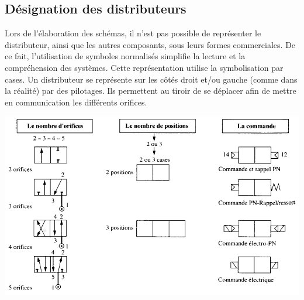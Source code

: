 \documentclass[10pt]{article}
\begin{document}
\subsection{Désignation des distributeurs}
Lors de l'élaboration des schémas, il n'est pas possible de représenter le distributeur, ainsi que les autres composants, sous leurs formes commerciales. De ce fait, l'utilisation de symboles normalisés simplifie la lecture et la compréhension des systèmes. Cette représentation utilise la symbolisation par cases.
Un distributeur se représente sur les côtés droit et/ou gauche (comme dans la réalité) par des pilotages. Ils permettent au tiroir de se déplacer afin de mettre en communication les différents orifices.

\begin{center}
\includegraphics[width=.8\textwidth]{images/Fig_10_distri}
\end{center}

\begin{center}
\end{center}
\end{document}
